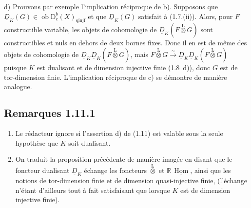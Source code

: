 \documentclass[11pt]{article}
\DeclareMathOperator{\Hom}{Hom}
\newcommand{\R}{\mathbb{R}}\newcommand{\RHomCore}{\mathbb{R}\mathrm{Hom}}
\newcommand{\D}{\mathrm{D}}
\newcommand{\ob}{\operatorname{ob}}
\providecommand{\Hom}{\operatorname{Hom}}
\providecommand{\ob}{\operatorname{ob}}
\providecommand{\R}{\mathrm R}
\providecommand{\Hom}{\operatorname{Hom}}
\begin{document}
d)
Prouvons par exemple l'implication réciproque de b). Supposons que $\underline{D}_K(G) \in \ob \D_c^{b}(X)_{\mathrm{qinjf}}$ et que $\underline{D}_K(G)$ satisfait à (1.7.(ii)). Alors, pour $F$ constructible variable, les objets de cohomologie de $\underline{D}_K(F \mathop{\otimes}\limits^{\mathrm{L}} G)$ sont constructibles et nuls en dehors de deux bornes fixes. Donc il en est de même des objets de cohomologie de $\underline{D}_K \underline{D}_K(F \mathop{\otimes}\limits^{\mathrm{L}} G)$, mais $F \mathop{\otimes}\limits^{\mathrm{L}} G \xrightarrow{\sim} \underline{D}_K \underline{D}_K(F \mathop{\otimes}\limits^{\mathrm{L}} G)$ puisque $K$ est dualisant et de dimension injective finie (1.8~d)), donc $G$ est de tor-dimension finie. L'implication réciproque de c) se démontre de manière analogue.

\subsection*{Remarques 1.11.1}
\begin{enumerate}
\item[a)] Le rédacteur ignore si l'assertion d) de (1.11) est valable sous la seule hypothèse que $K$ soit dualisant.
\item[b)] On traduit la proposition précédente de manière imagée en disant que le foncteur dualisant $\underline{D}_K$ échange les foncteurs $\mathop{\otimes}\limits^{\mathrm{L}}$ et $\R\,\underline{\Hom}$, ainsi que les notions de tor-dimension finie et de dimension quasi-injective finie, (l'échange n'étant d'ailleurs tout à fait satisfaisant que lorsque $K$ est de dimension injective finie).
\end{enumerate}
\end{document}
